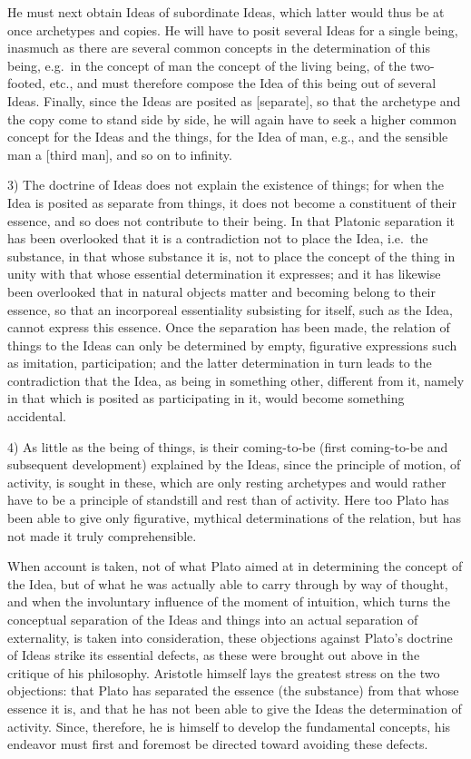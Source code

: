 He must next obtain Ideas of subordinate Ideas, which
latter would thus be at once archetypes and copies.
He will have to posit several Ideas for a single being, inasmuch as
there are several common concepts in the determination of this being, e.g.\
in the concept of man the concept of the living being, of the
two-footed, etc., and must therefore compose the Idea of this being
out of several Ideas. Finally, since the Ideas are posited as
 [separate], so that the archetype and the copy come to
stand side by side, he will again have to seek a higher common concept for the Ideas and the things, for the Idea of man, e.g.,
and the sensible man a \gk{τρίτος ἄνθρωπος} [third man], and so
on to infinity.

3) The doctrine of Ideas does not explain the existence of things; for when
the Idea is posited as separate from things, it does not become a constituent of their essence, and so does not contribute to their being.
In that Platonic separation it has been overlooked that it is a
contradiction not to place the Idea, i.e.\ the substance, in that whose
substance it is, not to place the concept of the thing in unity with
that whose essential determination it expresses; and it has likewise been overlooked that in natural objects matter and becoming
belong to their essence, so that an incorporeal essentiality subsisting for itself,
such as the Idea, cannot express this essence. Once
the separation has been made, the relation of things to the Ideas can only
be determined by empty, figurative expressions such as imitation,
participation; and the latter determination in turn leads to
the contradiction that the Idea, as being in something other, different from
it, namely in that which is posited as participating in it,
would become something accidental.

4) As little as the being of things, is their coming-to-be (first coming-to-be and subsequent development) explained by the Ideas,
since the principle of motion, of activity, is sought in these, which
are only resting archetypes and would rather have to be a principle
of standstill and rest than of activity. Here too
Plato has been able to give only figurative, mythical determinations of
the relation, but has not made it truly comprehensible.

When account is taken, not of what Plato aimed at
in determining the concept of the Idea, but of what he was actually able to carry through by way
of thought, and when the involuntary influence of the moment of intuition, which turns the conceptual separation of the Ideas and
things into an actual separation of externality,
is taken into consideration, these objections against Plato's
doctrine of Ideas strike its essential defects, as these were
brought out above in the critique of his philosophy. Aristotle himself lays the greatest stress on the two objections:
that Plato has separated the essence (the substance) from that whose essence it is, and that he has not been able to give the Ideas the determination of activity. Since, therefore, he is himself to develop the fundamental concepts, his endeavor must first and foremost be directed toward
avoiding these defects.

